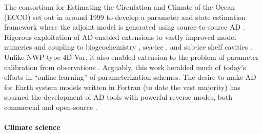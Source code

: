 The consortium for Estimating the Circulation and Climate of the Ocean (ECCO) \cite{Stammer.2002} set out in around 1999 to develop a parameter and state estimation framework
where the adjoint model is generated using source-to-source AD \cite{Marotzke:1999, Heimbach.2005}. 
Rigorous exploitation of AD enabled extensions to vastly improved model numerics \cite{Forget.2015m9i} and coupling to biogeochemistry \cite{Dutkiewicz:2006gw}, sea-ice \cite{Heimbach:2010fz}, and sub-ice shelf cavities \cite{Heimbach:2012iu,Goldberg:2020dl}.
Unlike NWP-type 4D-Var, it also enabled extension to the problem of parameter calibration from observations \cite{Ferreira.2005,Stammer:2005dw,Liu:2012jd}. 
Arguably, this work heralded much of today's efforts in ``online learning'' of parameterization schemes.
The desire to make AD for Earth system models written in Fortran (to date the vast majority) has  spurned the development of AD tools with powerful reverse modes, both commercial \cite{Giering:1998in,Giering.2006} and open-source \cite{Utke:2008ko,Hascoet.2013,Gaikwad.2023,Gaikwad.2024}.

\paragraph{Climate science}

